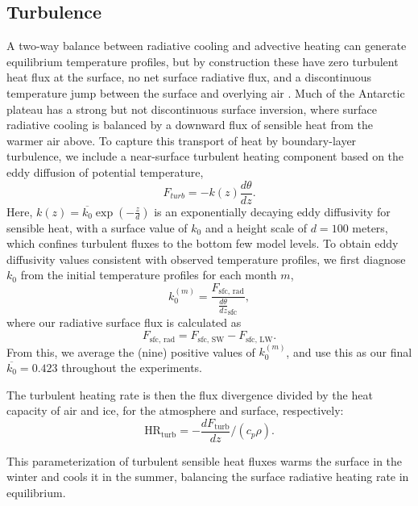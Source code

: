 \documentclass[draft]{agujournal2019}
\begin{document}
\subsection{Turbulence}
A two-way balance between radiative cooling and advective heating can generate equilibrium temperature profiles, but by construction these have zero turbulent heat flux at the surface, no net surface radiative flux, and a discontinuous temperature jump between the surface and overlying air \cite{cronin_analytic_2016}. Much of the Antarctic plateau has a strong but not discontinuous surface inversion, where surface radiative cooling is balanced by a downward flux of sensible heat from the warmer air above. To capture this transport of heat by boundary-layer turbulence, we include a near-surface turbulent heating component based on the eddy diffusion of potential temperature,
\begin{equation}
    F_{turb} = -k(z) \frac{d\theta}{dz}.
\end{equation}
Here, $k(z) = \overline{k_0} \exp(-\frac{z}{d})$ is an exponentially decaying eddy diffusivity for sensible heat, with a surface value of $k_0$ and a height scale of $d = 100$ meters, which confines turbulent fluxes to the bottom few model levels. To obtain eddy diffusivity values consistent with observed temperature profiles, we first diagnose $k_0$ from the initial temperature profiles for each month $m$,
\begin{equation}
    k_0^{(m)} = \frac{F_{\text{sfc, rad}}}{\frac{d\theta}{dz}_{\text{sfc}}},
\end{equation}
where our radiative surface flux is calculated as
\begin{equation}
    F_{\text{sfc, rad}} = F_{\text{sfc, SW}} - F_{\text{sfc, LW}}.
\end{equation}
From this, we average the (nine) positive values of $k_0^{(m)}$, and use this as our final $\overline{k_0} = 0.423$ throughout the experiments.

The turbulent heating rate is then the flux divergence divided by the heat capacity of air and ice, for the atmosphere and surface, respectively:
\begin{equation}
    \text{HR}_{\text{turb}} = -\frac{dF_{\text{turb}}}{dz} /(c_p \rho).
\end{equation}

This parameterization of turbulent sensible heat fluxes warms the surface in the winter and cools it in the summer, balancing the surface radiative heating rate in equilibrium.
\end{document}
